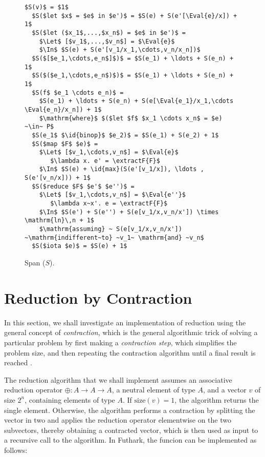 \documentclass[oneside,11pt]{book}
\begin{document}
\begin{figure}
\begin{lstlisting}[mathescape=true,style=nonumbers]
  $S(v)$ = $1$
  $S($let $x$ = $e$ in $e')$ = $S(e) + S(e'[\Eval{e}/x]) + 1$
  $S($let ($x_1$,...,$x_n$) = $e$ in $e')$ =
    $\Let$ [$v_1$,...,$v_n$] = $\Eval{e}$
    $\In$ $S(e) + S(e'[v_1/x_1,\cdots,v_n/x_n])$
  $S($[$e_1,\cdots,e_n$]$)$ = $S(e_1) + \ldots + S(e_n) + 1$
  $S($($e_1,\cdots,e_n$)$)$ = $S(e_1) + \ldots + S(e_n) + 1$
  $S(f$ $e_1 \cdots e_n)$ =
    $S(e_1) + \ldots + S(e_n) + S(e[\Eval{e_1}/x_1,\cdots \Eval{e_n}/x_n]) + 1$
    $\mathrm{where}$ $($let $f$ $x_1 \cdots x_n$ = $e) ~\in~ P$
  $S(e_1$ $\id{binop}$ $e_2)$ = $S(e_1) + S(e_2) + 1$
  $S($map $F$ $e)$ =
    $\Let$ [$v_1,\cdots,v_n$] = $\Eval{e}$
       $\lambda x. e' = \extractF{F}$
    $\In$ $S(e) + \id{max}(S(e'[v_1/x]), \ldots , S(e'[v_n/x])) + 1$
  $S($reduce $F$ $e'$ $e'')$ =
    $\Let$ [$v_1,\cdots,v_n$] = $\Eval{e''}$
       $\lambda x~x'. e = \extractF{F}$
    $\In$ $S(e') + S(e'') + S(e[v_1/x,v_n/x']) \times \mathrm{ln}\,n + 1$
    $\mathrm{assuming} ~ S(e[v_1/x,v_n/x']) ~\mathrm{indifferent~to} ~v_1~ \mathrm{and} ~v_n$
  $S($iota $e)$ = $S(e) + 1$
\end{lstlisting}

\caption{Span ($S$).}
\label{fig:span}
\end{figure}

\section{Reduction by Contraction}

In this section, we shall investigate an implementation of reduction
using the general concept of \emph{contraction}, which is the general
algorithmic trick of solving a particular problem by first making a
\emph{contraction step}, which simplifies the problem size, and then
repeating the contraction algorithm until a final result is reached
\cite{algdesign:parseq2016}.

The reduction algorithm that we shall implement assumes an associative
reduction operator $\oplus : A \rightarrow A \rightarrow A$, a neutral
element of type $A$, and a vector $v$ of size $2^n$, containing
elements of type $A$. If $\mathrm{size}(v) = 1$, the algorithm returns
the single element. Otherwise, the algorithm performs a contraction by
splitting the vector in two and applies the reduction operator
elementwise on the two subvectors, thereby obtaining a contracted
vector, which is then used as input to a recursive call to the
algorithm. In Futhark, the funcion  can be implemented as
follows:
\end{document}
